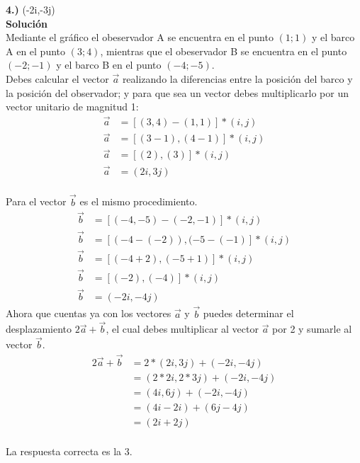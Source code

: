 \documentclass[11pt, a4paper]{article} %
\theoremstyle{dotlessP}
\theoremstyle{dotlessS}
\begin{document}
\begin{enumerate}[label=\color{dg}\theenumi.]
     {\color{dh} \textbf{4.)} \quad (-2i,-3j)}   \vspace{1\baselineskip} \\ 	
      \)
        \textbf{Solución} 
\\ Mediante el gráfico el obeservador A se encuentra en el punto \((1; 1)\) y el barco A en el punto \((3; 4)\), mientras que el obeservador B se encuentra en el punto \((-2 ; -1)\) y el barco B en el punto \((-4; -5)\).
\\ Debes calcular el vector $\vec{a}$ realizando la diferencias entre la posición del barco y la posición del observador; y para que sea un vector debes multiplicarlo por un vector unitario de magnitud 1: 
\begin{align*}
\vec{a} &=[(3, 4)-(1, 1)]*(i,j)
\\
\vec{a} &=[(3-1),(4-1)]*(i,j)
\\
\vec{a} &=[(2),(3)]*(i,j)
\\
\vec{a} &=(2i,3j)
\end{align*}
\\ Para el vector $\vec{b}$ es el mismo procedimiento. 
\begin{align*}
\vec{b} &=[(-4, -5)-(-2, -1)]*(i,j)
\\
\vec{b} &=[(-4-(-2)),(-5-(-1)]*(i,j)
\\
\vec{b} &=[(-4+2),(-5+1)]*(i,j)
\\
\vec{b} &=[(-2),(-4)]*(i,j)
\\
\vec{b} &=(-2i,-4j)
\end{align*}
Ahora que cuentas ya con los vectores \(\vec {a}\) y \(\vec {b}\) puedes determinar el desplazamiento \(2 \vec{a} + \vec {b}\), el cual debes multiplicar al vector \(\vec {a}\) por 2 y sumarle al vector \(\vec {b}\).
\begin{align*}
2 \vec{a} + \vec{b} &=2*(2i,3j) + (-2i,-4j)
\\
&=(2*2i,2*3j) + (-2i,-4j)
\\
&=(4i,6j) + (-2i,-4j)
\\
&=(4i-2i) + (6j-4j)
\\
&=(2i + 2j)
\end{align*}
\\
{\color{dh} La respuesta correcta es la 3.}
\\
\end{enumerate}
\end{document}
